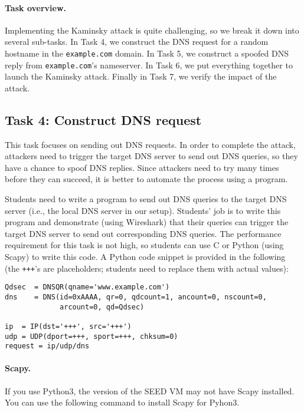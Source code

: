\paragraph{Task overview.} Implementing the Kaminsky attack is quite challenging, 
so we break it down into several sub-tasks. 
In Task 4, we construct the DNS request for a random hostname 
in the \texttt{example.com} domain. In Task 5, we construct a spoofed 
DNS reply from \texttt{example.com}'s nameserver.
In Task 6, we put everything together to launch the 
Kaminsky attack. Finally in Task 7, we verify the impact of the attack. 


\subsection{Task 4: Construct DNS request} 

This task focuses on sending out DNS requests. 
In order to complete the attack, attackers need to trigger the target 
DNS server to send out DNS queries, so they have a chance 
to spoof DNS replies. Since attackers need to try many times before they 
can succeed, it is better to automate the process using a program. 

Students need to write a program to send out DNS queries to the target DNS 
server (i.e., the local DNS server in our setup). 
Students' job is to write this program
and demonstrate (using Wireshark) that their queries can
trigger the target DNS server to send out corresponding DNS queries.
The performance requirement for this task is not high, so
students can use C or Python (using Scapy) to write this code. 
A Python code snippet is provided in the following (the 
\texttt{+++}'s are placeholders; students need to replace them
with actual values): 

\begin{lstlisting}
Qdsec  = DNSQR(qname='www.example.com')
dns    = DNS(id=0xAAAA, qr=0, qdcount=1, ancount=0, nscount=0,
             arcount=0, qd=Qdsec)

ip  = IP(dst='+++', src='+++')
udp = UDP(dport=+++, sport=+++, chksum=0)
request = ip/udp/dns
\end{lstlisting}
 

\paragraph{Scapy.} If you use Python3, the version of the SEED VM 
may not have Scapy installed. You can use the following command to 
install Scapy for Pyhon3. 


